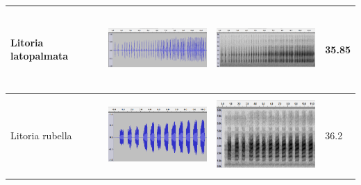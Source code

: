 \begin{table}[htb!]
\begin{tabular}{llll}
Litoria latopalmata &      \begin{minipage}{.3\textwidth} \includegraphics[width=45mm, height=30mm]{image/latop_wav.png}  \end{minipage}  &    \begin{minipage}{.3\textwidth} \includegraphics[width=45mm, height=30mm]{image/latop_spec.png}    \end{minipage}     & 35.85 \\ \hline
Litoria rubella     &   \begin{minipage}{.3\textwidth} \includegraphics[width=45mm, height=30mm]{image/rubella_wav.png}   \end{minipage}    &       \begin{minipage}{.3\textwidth} \includegraphics[width=45mm, height=30mm]{image/rubella_spec.png}   \end{minipage}   & 36.2  \\ \hline\hline
\end{tabular}
\end{table}



